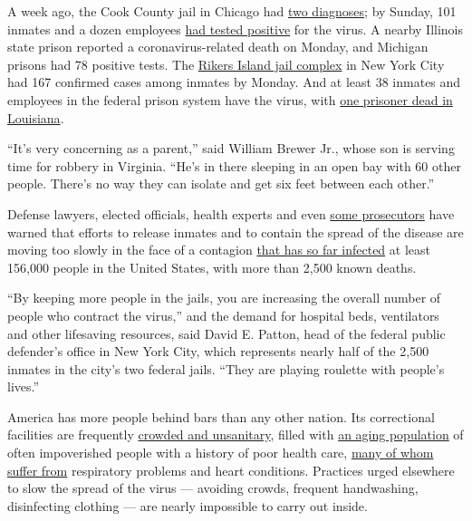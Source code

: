 A week ago, the Cook County jail in Chicago had
\href{https://chicago.suntimes.com/2020/3/23/21191438/two-cook-county-jail-detainees-test-positive-covid-19-coronavirus}{two
diagnoses}; by Sunday, 101 inmates and a dozen employees
\href{https://chicago.suntimes.com/coronavirus/2020/3/29/21199171/cook-county-jail-coronavirus-positive-101-cases-covid-19}{had
tested positive} for the virus. A nearby Illinois state prison reported
a coronavirus-related death on Monday, and Michigan prisons had 78
positive tests. The
\href{https://www.nytimes3xbfgragh.onion/2020/03/30/nyregion/coronavirus-rikers-nyc-jail.html}{Rikers
Island jail complex} in New York City had 167 confirmed cases among
inmates by Monday. And at least 38 inmates and employees in the federal
prison system have the virus, with
\href{https://www.nytimes3xbfgragh.onion/reuters/2020/03/29/us/29reuters-heath-coronavirus-prison-death.html}{one
prisoner dead in Louisiana}.

``It's very concerning as a parent,'' said William Brewer Jr., whose son
is serving time for robbery in Virginia. ``He's in there sleeping in an
open bay with 60 other people. There's no way they can isolate and get
six feet between each other.''

Defense lawyers, elected officials, health experts and even
\href{https://www.nytimes3xbfgragh.onion/2020/03/30/opinion/nyc-prison-release-covid.html}{some
prosecutors} have warned that efforts to release inmates and to contain
the spread of the disease are moving too slowly in the face of a
contagion
\href{https://www.nytimes3xbfgragh.onion/interactive/2020/us/coronavirus-us-cases.html}{that
has so far infected} at least 156,000 people in the United States, with
more than 2,500 known deaths.

``By keeping more people in the jails, you are increasing the overall
number of people who contract the virus,'' and the demand for hospital
beds, ventilators and other lifesaving resources, said David E. Patton,
head of the federal public defender's office in New York City, which
represents nearly half of the 2,500 inmates in the city's two federal
jails. ``They are playing roulette with people's lives.''

America has more people behind bars than any other nation. Its
correctional facilities are frequently
\href{https://www.nytimes3xbfgragh.onion/2019/12/13/us/rural-jails.html}{crowded
and unsanitary}, filled with
\href{https://www.nytimes3xbfgragh.onion/2012/01/27/us/older-prisoners-mean-rising-health-costs-study-finds.html}{an
aging population} of often impoverished people with a history of poor
health care, \href{https://www.ncbi.nlm.nih.gov/pubmed/29584869}{many of
whom suffer from} respiratory problems and heart conditions. Practices
urged elsewhere to slow the spread of the virus --- avoiding crowds,
frequent handwashing, disinfecting clothing --- are nearly impossible to
carry out inside.

